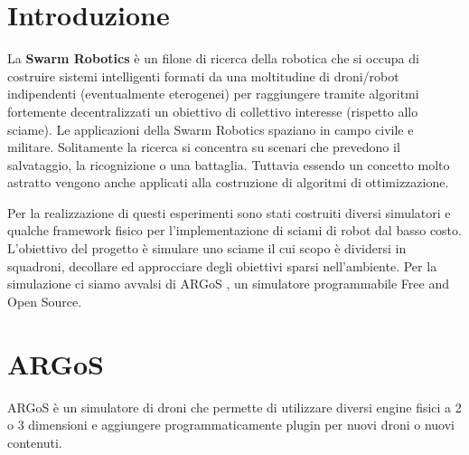 \documentclass[a4paper,11pt,oneside, table]{article}
\begin{document}
    \printindex
    \tableofcontents
    \renewcommand{\baselinestretch}{1.5}

\section{Introduzione}

La \textbf{Swarm Robotics} \`e un filone di ricerca della robotica che si occupa di costruire sistemi intelligenti formati da una moltitudine di droni/robot indipendenti (eventualmente eterogenei) per raggiungere tramite algoritmi fortemente decentralizzati un obiettivo di collettivo interesse (rispetto allo sciame).
Le applicazioni della Swarm Robotics spaziano in campo civile e militare.
Solitamente la ricerca si concentra su scenari che prevedono il salvataggio, la ricognizione o una battaglia.
Tuttavia essendo un concetto molto astratto vengono anche applicati alla costruzione di algoritmi di ottimizzazione.

Per la realizzazione di questi esperimenti sono stati costruiti diversi simulatori e qualche framework fisico per l'implementazione di sciami di robot dal basso costo.
L'obiettivo del progetto \`e simulare uno sciame il cui scopo \`e dividersi in squadroni, decollare ed approcciare degli obiettivi sparsi nell'ambiente.
Per la simulazione ci siamo avvalsi di ARGoS \cite{Pinciroli:SI2012}, un simulatore programmabile Free and Open Source.

\section{ARGoS}

ARGoS \`e un simulatore di droni che permette di utilizzare diversi engine fisici a 2 o 3 dimensioni e aggiungere programmaticamente plugin per nuovi droni o nuovi contenuti.
\end{document}
